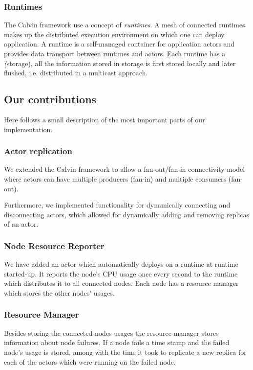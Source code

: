 \documentclass{cslthse-msc}
\begin{document}
\subsubsection{Runtimes} \label{sec:calvin_runtime}
The Calvin framework use a concept of \emph{runtimes}. A mesh of connected runtimes makes up the distributed execution environment on which one can deploy application. A runtime is a self-managed container for application actors and provides data transport between runtimes and actors. Each runtime has a \emph(storage), all the information stored in storage is first stored locally and later flushed, i.e. distributed in a multicast approach.

\subsection{Our contributions} \label{subsec:design_contributions} %
Here follows a small description of the most important parts of our implementation.

\subsubsection{Actor replication}
We extended the Calvin framework to allow a fan-out/fan-in connectivity model where actors can have multiple producers (fan-in) and multiple consumers (fan-out). 

Furthermore, we implemented functionality for dynamically connecting and disconnecting actors, which allowed for dynamically adding and removing replicas of an actor.


\subsubsection{Node Resource Reporter}
We have added an actor which automatically deploys on a runtime at runtime started-up. It reports the node's CPU usage once every second to the runtime which distributes it to all connected nodes. Each node has a resource manager which stores the other nodes' usages.


\subsubsection{Resource Manager}
Besides storing the connected nodes usages the resource manager stores information about node failures. If a node fails a time stamp and the failed node's usage is stored, among with the time it took to replicate a new replica for each of the actors which were running on the failed node.
\end{document}
